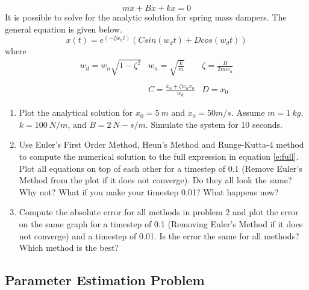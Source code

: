 \begin{enumerate}
\begin{equation}\label{e:full}
m\ddot{x} + B\dot{x} + k x = 0
\end{equation}
It is possible to solve for the analytic solution for spring mass
dampers. The general equation is given below. 
\begin{equation}
x(t) = e^{(-\zeta w_n t)} \left( C sin(w_d t) + D cos(w_d t) \right)
\end{equation}
where
\begin{equation}
\begin{matrix}
w_d = w_n\sqrt{1-\zeta^2} & w_n = \sqrt{\frac{k} m} & \zeta = \frac{B} {2mw_n} \\
\ & \ \\
& C = \frac{\dot{x}_0 + \zeta w_n x_0} {w_d} & D = x_0 
\end{matrix}
\end{equation}

\begin{enumerate}

\item Plot the analytical solution for $x_0 = 5~m$ and
$\dot{x}_0 = 50 m/s$. Assume $m=1~kg$, $k=100~N/m$, and
$B=2~N-s/m$. Simulate the system for 10 seconds.
\ \\

\item Use Euler's First Order Method, Heun's Method and
Runge-Kutta-4 method to compute the numerical solution to the full expression in equation
\ref{e:full}. Plot all equations on top of each other for a timestep
of 0.1 (Remove Euler's Method from the plot if it does not
converge). Do they all look the same? Why not? What if you make your
timestep 0.01? What happens now? 
\ \\

\item Compute the absolute error for all methods in problem 2
and plot the error on the same graph for a timestep of 0.1 (Removing
Euler's Method if it does not converge) and a timestep of 0.01. Is the
error the same for all methods? Which method is the best? 

\end{enumerate}

\end{enumerate}

\subsection{Parameter Estimation Problem}

